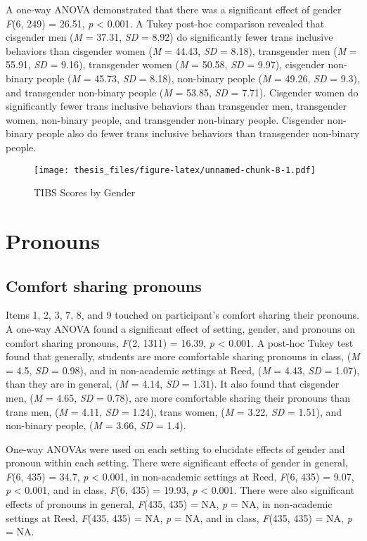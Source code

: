 \documentclass[12pt,twoside]{reedthesis}
\begin{document}
A one-way ANOVA demonstrated that there was a significant effect of gender \emph{F}(6, 249) = 26.51, \emph{p} \textless{} 0.001.
A Tukey post-hoc comparison revealed that cisgender men (\emph{M} = 37.31, \emph{SD} = 8.92) do significantly fewer trans inclusive behaviors than cisgender women (\emph{M} = 44.43, \emph{SD} = 8.18), transgender men (\emph{M} = 55.91, \emph{SD} = 9.16), transgender women (\emph{M} = 50.58, \emph{SD} = 9.97), cisgender non-binary people (\emph{M} = 45.73, \emph{SD} = 8.18), non-binary people (\emph{M} = 49.26, \emph{SD} = 9.3), and transgender non-binary people (\emph{M} = 53.85, \emph{SD} = 7.71). Cisgender women do significantly fewer trans inclusive behaviors than transgender men, transgender women, non-binary people, and transgender non-binary people. Cisgender non-binary people also do fewer trans inclusive behaviors than transgender non-binary people.
\begin{figure}
\centering
\texttt{[image: thesis\_files/figure-latex/unnamed-chunk-8-1.pdf]}
\caption{\label{fig:unnamed-chunk-8}TIBS Scores by Gender}
\end{figure}
\hypertarget{pronouns-1}{%
\section{Pronouns}\label{pronouns-1}}

\hypertarget{comfort-sharing-pronouns}{%
\subsection{Comfort sharing pronouns}\label{comfort-sharing-pronouns}}

Items 1, 2, 3, 7, 8, and 9 touched on participant's comfort sharing their pronouns.
A one-way ANOVA found a significant effect of setting, gender, and pronouns on comfort sharing pronouns, \emph{F}(2, 1311) = 16.39, \emph{p} \textless{} 0.001. A post-hoc Tukey test found that generally, students are more comfortable sharing pronouns in class, (\emph{M} = 4.5, \emph{SD} = 0.98), and in non-academic settings at Reed, (\emph{M} = 4.43, \emph{SD} = 1.07), than they are in general, (\emph{M} = 4.14, \emph{SD} = 1.31). It also found that cisgender men, (\emph{M} = 4.65, \emph{SD} = 0.78), are more comfortable sharing their pronouns than trans men, (\emph{M} = 4.11, \emph{SD} = 1.24), trans women, (\emph{M} = 3.22, \emph{SD} = 1.51), and non-binary people, (\emph{M} = 3.66, \emph{SD} = 1.4).

One-way ANOVAs were used on each setting to elucidate effects of gender and pronoun within each setting. There were significant effects of gender in general, \emph{F}(6, 435) = 34.7, \emph{p} \textless{} 0.001, in non-academic settings at Reed, \emph{F}(6, 435) = 9.07, \emph{p} \textless{} 0.001, and in class, \emph{F}(6, 435) = 19.93, \emph{p} \textless{} 0.001. There were also significant effects of pronouns in general, \emph{F}(435, 435) = NA, \emph{p} = NA, in non-academic settings at Reed, \emph{F}(435, 435) = NA, \emph{p} = NA, and in class, \emph{F}(435, 435) = NA, \emph{p} = NA.
\end{document}
